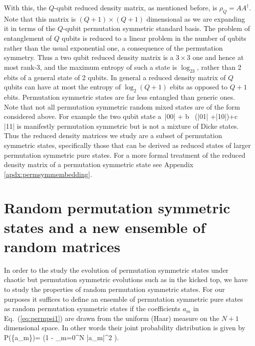\documentclass[pre,aps,showpacs,showkeys,twocolumn]{revtex4-1}
\theoremstyle{definition}
\theoremstyle{remark}
\begin{document}
With this, the $Q$-qubit reduced density matrix, as mentioned before, is $\rho_Q = A A^{\dagger}$. Note that this matrix is $(Q + 1) \times (Q + 1)$ dimensional as we are expanding it in terms of the $Q$-qubit permutation symmetric standard basis. The problem of entanglement of $Q$ qubits is reduced to a linear problem in the number of qubits rather than the usual exponential one, a consequence of the permutation symmetry. Thus a two qubit reduced density matrix is a $3 \times 3$ one and hence at most rank-3, and the maximum entropy of such a state is $\log_23$, rather than 2 ebits of a general state of 2 qubits. In general a reduced density matrix of $Q$ qubits can have at most the entropy of $\log_2(Q+1)$ ebits as opposed to $Q+1$ ebits. Permutation symmetric states are far less entangled than generic ones.
Note that not all permutation symmetric random mixed states are of the form considered above. For example the two qubit state
\beq
a\,  |00\kt {}| + b \, (|01\kt {}| +|10\kt {}|)+c\, |11\kt {}|
\eeq 
is manifestly permutation symmetric but is not a mixture of Dicke states. Thus the reduced density matrices we study are a subset of permutation symmetric states, specifically those that can be derived as reduced states of larger permutation symmetric pure states. For a more formal treatment of the reduced density matrix of a permutation symmetric state see Appendix \ref{apdx:permsymmembedding}.

\section{Random permutation symmetric states and a new ensemble of random matrices}

In order to the study the evolution of permutation symmetric states under chaotic but permutation symmetric evolutions such as in the kicked top, we have to study the properties of random permutation symmetric states. For our purposes it suffices to define an ensemble of permutation symmetric pure states as random permutation symmetric states if the coefficients $a_m$ in Eq.~(\ref{eq:permpsi1}) are drawn from the uniform (Haar) measure on the $N + 1$ dimensional space. In other words their joint probability distribution is given by 
\beq
\label{eq:jpdfHaar}
P(\{a_m\})= \delta\left(1 - \sum_{m=0}^N |a_m|^2 \right).
\eeq
\end{document}
